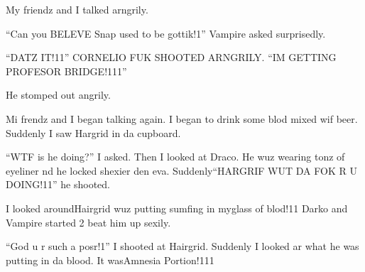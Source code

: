 My friendz and I talked arngrily.

\enquote{Can you BELEVE Snap used to be gottik!1} Vampire asked surprisedly.

\enquote{DATZ IT!11} CORNELIO FUK SHOOTED ARNGRILY\@. \enquote{IM GETTING PROFESOR BRIDGE!111}

He stomped out angrily.

Mi frendz and I began talking again. I began to drink some blod mixed wif beer. Suddenly I saw Hargrid in da cupboard.

\enquote{WTF is he doing?} I asked. Then I looked at Draco. He wuz wearing tonz of eyeliner nd he locked shexier den eva. Suddenly\dotfill\enquote{HARGRIF WUT DA FOK R U DOING!11}\newline
he shooted.

I looked around\dotfill Hairgrid wuz putting sumfing in my\newline glass of blod!11 Darko and Vampire started 2 beat him up sexily.

\enquote{God u r such a posr!1} I shooted at Hairgrid. Suddenly I looked ar what he was putting in da blood. It was\dotfill\newline Amnesia Portion!111
